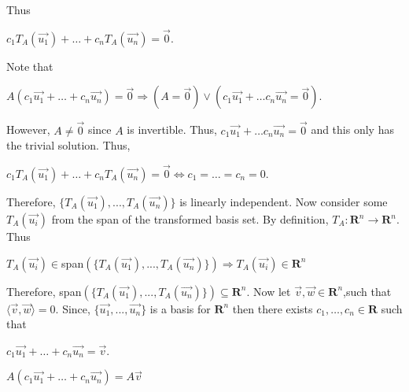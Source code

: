 \documentclass[12pt, a4paper]{article}
\begin{document}
Thus

\vspace{4mm}

\centerline{$c_1T_A(\Vec{u_1})+\dots+c_nT_A(\Vec{u_n})=\Vec{0}$.}

\vspace{4mm}

Note that\par

\vspace{4mm}

\centerline{$A(c_1\Vec{u_1}+\dots+c_n\Vec{u_n})=\Vec{0}\Rightarrow (A=\Vec{0})\vee(c_1\Vec{u_1}+\ldots c_n\Vec{u_n}=\Vec{0})$.}

\vspace{4mm}

However, $A\neq\Vec{0}$ since $A$ is invertible. Thus, $c_1\Vec{u_1}+\ldots c_n\Vec{u_n}=\Vec{0}$ and this only has the trivial solution. Thus,\par

\vspace{4mm}

    \centerline{$c_1T_A(\Vec{u_1})+\dots+c_nT_A(\Vec{u_n})=\Vec{0}\Leftrightarrow c_1=\dots=c_n=0$.}
    
\vspace{4mm}

    Therefore, $\{T_A(\Vec{u_1}), ..., T_A(\Vec{u_n})\}$ is linearly independent. Now consider some $T_A(\Vec{u_i})$ from the span of the transformed basis set. By definition, $T_A\colon\mathbf{R}^n\rightarrow\mathbf{R}^n$. Thus\par
    
\vspace{4mm}

    \centerline{$T_A(\Vec{u_i})\in$span$(\{T_A(\Vec{u_1}), ..., T_A(\Vec{u_n})\})\Rightarrow T_A(\Vec{u_i})\in\mathbf{R}^n$}
    
\vspace{4mm}

    Therefore, span$(\{T_A(\Vec{u_1}), ..., T_A(\Vec{u_n})\})\subseteq\mathbf{R}^n$. Now let $\Vec{v},\Vec{w}\in\mathbf{R}^n$,such that $\langle\Vec{v},\Vec{w}\rangle=0$. Since, $\{\Vec{u_1}, ..., \Vec{u_n}\}$ is a basis for $\mathbf{R}^n$ then there exists $c_1,\ldots, c_n\in\mathbf{R}$ such that\par
    
\vspace{4mm}

\centerline{$c_1\Vec{u_1}+\dots+c_n\Vec{u_n}=\vec{v}$.}

\vspace{4mm}

\centerline{$A(c_1\Vec{u_1}+\dots+c_n\Vec{u_n})=A\vec{v}$}

    
\end{document}
